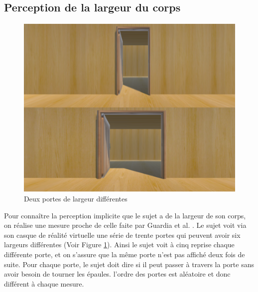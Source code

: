 \subsection{Perception de la largeur du corps}
\begin{figure}[!h]
   	\centerline{\includegraphics[scale=0.25]{images/doubleDoor3}}
   	\caption{\label{figDoor} Deux portes de largeur différentes }
\end{figure}
Pour connaître la perception implicite que le sujet a de la largeur de son corps, on réalise une mesure proche de celle faite par Guardia et al. \cite{gu10}. Le sujet voit via son casque de réalité virtuelle une série de trente portes qui peuvent avoir six largeurs différentes (Voir Figure \ref{figDoor}). Ainsi le sujet voit à cinq reprise chaque différente porte, et on s'assure que la même porte n'est pas affiché deux fois de suite. Pour chaque porte, le sujet doit dire si il peut passer à travers la porte sans avoir besoin de tourner les épaules. l'ordre des portes est aléatoire et donc différent à chaque mesure.

